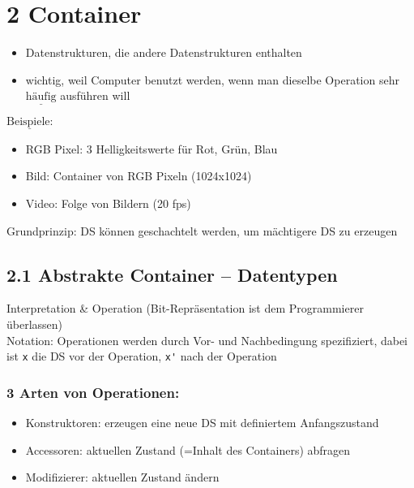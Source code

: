 \chapter*{2 Container}
\begin{itemize}[label={-}]
    \item Datenstrukturen, die andere Datenstrukturen enthalten
    \item wichtig, weil Computer benutzt werden, wenn man dieselbe Operation sehr $\underline{\text{häufig}}$ ausführen will
\end{itemize}
$\underline{\text{Beispiele:}}$
\begin{itemize}[label={-}]
    \item RGB Pixel: 3 Helligkeitswerte für Rot, Grün, Blau
    \item Bild: Container von RGB Pixeln (1024x1024)
    \item Video: Folge von Bildern (20 fps)
\end{itemize}
Grundprinzip: DS können geschachtelt werden, um mächtigere DS zu erzeugen



\section*{2.1 Abstrakte Container – Datentypen}

Interpretation \& Operation (Bit-Repräsentation ist dem Programmierer überlassen) \\

Notation: Operationen werden durch Vor- und Nachbedingung spezifiziert, dabei ist \verb|x| die DS vor der Operation, \verb|x'| nach der Operation \\

\subsection*{3 Arten von Operationen: }
\begin{itemize}[label={-}]
    \item Konstruktoren: erzeugen eine neue DS mit definiertem Anfangszustand
    \item Accessoren: aktuellen Zustand (=Inhalt des Containers) abfragen
    \item Modifizierer: aktuellen Zustand ändern
\end{itemize}


